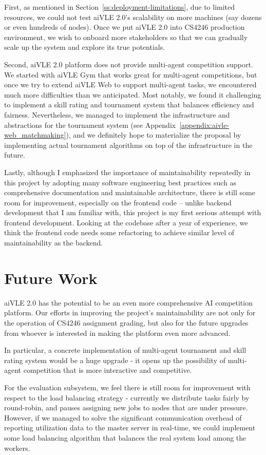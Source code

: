 First, as mentioned in Section~\ref{ss:deployment-limitations}, due to limited resources, we could not test aiVLE 2.0's scalability on more machines (say dozens or even hundreds of nodes). Once we put aiVLE 2.0 into CS4246 production environment, we wish to onboard more stakeholders so that we can gradually scale up the system and explore its true potentials.

Second, aiVLE 2.0 platform does not provide multi-agent competition support. We started with aiVLE Gym that works great for multi-agent competitions, but once we try to extend aiVLE Web to support multi-agent tasks, we encountered much more difficulties than we anticipated. Most notably, we found it challenging to implement a skill rating and tournament system that balances efficiency and fairness. Nevertheless, we managed to implement the infrastructure and abstractions for the tournament system (see Appendix~\ref{appendix:aivle-web_matchmaking}), and we definitely hope to materialize the proposal by implementing actual tournament algorithms on top of the infrastructure in the future.

Lastly, although I emphasized the importance of maintainability repeatedly in this project by adopting many software engineering best practices such as comprehensive documentation and maintainable architecture, there is still some room for improvement, especially on the frontend code – unlike backend development that I am familiar with, this project is my first serious attempt with frontend development. Looking at the codebase after a year of experience, we think the frontend code needs some refactoring to achieve similar level of maintainability as the backend.

\section{Future Work}
\label{s:conclusion-future_work}
aiVLE 2.0 has the potential to be an even more comprehensive AI competition platform. Our efforts in improving the project's maintainability are not only for the operation of CS4246 assignment grading, but also for the future upgrades from whoever is interested in making the platform even more advanced.

In particular, a concrete implementation of multi-agent tournament and skill rating system would be a huge upgrade - it opens up the possibility of multi-agent competition that is more interactive and competitive.

For the evaluation subsystem, we feel there is still room for improvement with respect to the load balancing strategy - currently we distribute tasks fairly by round-robin, and pauses assigning new jobs to nodes that are under pressure. However, if we managed to solve the significant communication overhead of reporting utilization data to the master server in real-time, we could implement some load balancing algorithm that balances the real system load among the workers.

